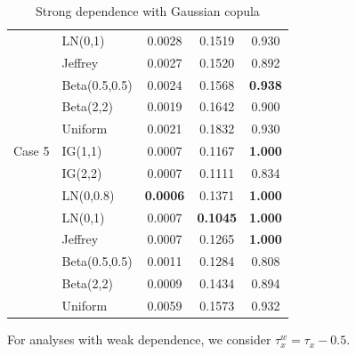 \documentclass{amsart}
\begin{document}
\begin{table}[ht]
\begin{tabular}{l|l|ccc}
  & LN(0,1) & 0.0028 & 0.1519 & 0.930 \\ 
  & Jeffrey & 0.0027 & 0.1520 & 0.892 \\ 
  & Beta(0.5,0.5) & 0.0024 & 0.1568 & \textbf{0.938} \\ 
  & Beta(2,2) & 0.0019 & 0.1642 & 0.900 \\ 
  & Uniform & 0.0021 & 0.1832 & 0.930 \\ 
   \midrule
Case 5 & IG(1,1) & 0.0007 & 0.1167 & \textbf{1.000} \\ 
  & IG(2,2) & 0.0007 & 0.1111 & 0.834 \\ 
  & LN(0,0.8) & \textbf{0.0006} & 0.1371 & \textbf{1.000} \\ 
  & LN(0,1) & 0.0007 & \textbf{0.1045} & \textbf{1.000} \\ 
  & Jeffrey & 0.0007 & 0.1265 & \textbf{1.000} \\ 
  & Beta(0.5,0.5) & 0.0011 & 0.1284 & 0.808 \\ 
  & Beta(2,2) & 0.0009 & 0.1434 & 0.894 \\ 
  & Uniform & 0.0059 & 0.1573 & 0.932 \\ 
   \bottomrule
\end{tabular}
\caption{Strong dependence with Gaussian copula}
\end{table}

For analyses with weak dependence, we consider $\tau_x^w = \tau_x - 0.5$.
\end{document}
